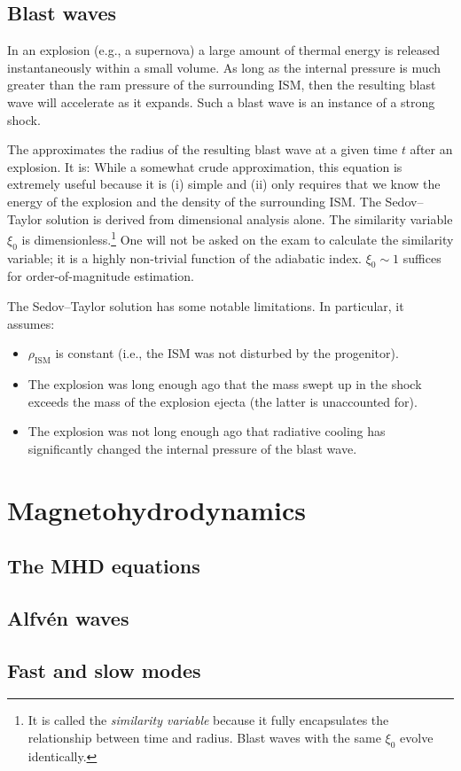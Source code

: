 \subsection{Blast waves}
In an explosion (e.g., a supernova) a large amount of thermal energy is released instantaneously within a small volume. As long as the internal pressure is much greater than the ram pressure of the surrounding ISM, then the resulting blast wave will accelerate as it expands. Such a blast wave is an instance of a strong shock.

The  approximates the radius of the resulting blast wave at a given time $t$ after an explosion. It is:
While a somewhat crude approximation, this equation is extremely useful because it is (i) simple and (ii) only requires that we know the energy of the explosion and the density of the surrounding ISM. The Sedov--Taylor solution is derived from dimensional analysis alone. The similarity variable $\xi_0$ is dimensionless.\footnote{It is called the \textit{similarity variable} because it fully encapsulates the relationship between time and radius. Blast waves with the same $\xi_0$ evolve identically.} One will not be asked on the exam to calculate the similarity variable; it is a highly non-trivial function of the adiabatic index. $\xi_0 \sim 1$ suffices for order-of-magnitude estimation.

The Sedov--Taylor solution has some notable limitations. In particular, it assumes:
\begin{itemize}
    \item $\rho_\text{ISM}$ is constant (i.e., the ISM was not disturbed by the progenitor).
    \item The explosion was long enough ago that the mass swept up in the shock exceeds the mass of the explosion ejecta (the latter is unaccounted for).
    \item The explosion was not long enough ago that radiative cooling has significantly changed the internal pressure of the blast wave.
\end{itemize}


\section{Magnetohydrodynamics}
\subsection{The MHD equations}

\subsection{Alfvén waves}

\subsection{Fast and slow modes}

